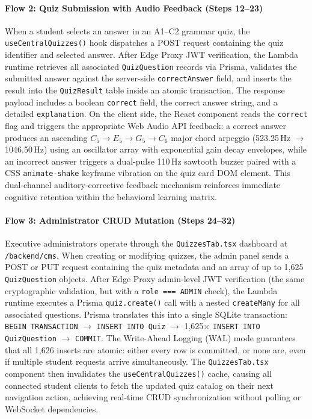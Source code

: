 \documentclass[12pt,a4paper]{article}
\begin{document}
\paragraph{Flow 2: Quiz Submission with Audio Feedback (Steps 12--23)}
When a student selects an answer in an A1--C2 grammar quiz, the \texttt{useCentralQuizzes()} hook dispatches a POST request containing the quiz identifier and selected answer. After Edge Proxy JWT verification, the Lambda runtime retrieves all associated \texttt{QuizQuestion} records via Prisma, validates the submitted answer against the server-side \texttt{correctAnswer} field, and inserts the result into the \texttt{QuizResult} table inside an atomic transaction. The response payload includes a boolean \texttt{correct} field, the correct answer string, and a detailed \texttt{explanation}. On the client side, the React component reads the \texttt{correct} flag and triggers the appropriate Web Audio API feedback: a correct answer produces an ascending $C_5 \rightarrow E_5 \rightarrow G_5 \rightarrow C_6$ major chord arpeggio (523.25\,Hz $\rightarrow$ 1046.50\,Hz) using an oscillator array with exponential gain decay envelopes, while an incorrect answer triggers a dual-pulse 110\,Hz sawtooth buzzer paired with a CSS \texttt{animate-shake} keyframe vibration on the quiz card DOM element. This dual-channel auditory-corrective feedback mechanism reinforces immediate cognitive retention within the behavioral learning matrix.

\paragraph{Flow 3: Administrator CRUD Mutation (Steps 24--32)}
Executive administrators operate through the \texttt{QuizzesTab.tsx} dashboard at \texttt{/backend/cms}. When creating or modifying quizzes, the admin panel sends a POST or PUT request containing the quiz metadata and an array of up to 1,625 \texttt{QuizQuestion} objects. After Edge Proxy admin-level JWT verification (the same cryptographic validation, but with a \texttt{role === \textquotesingle ADMIN\textquotesingle} check), the Lambda runtime executes a Prisma \texttt{quiz.create()} call with a nested \texttt{createMany} for all associated questions. Prisma translates this into a single SQLite transaction: \texttt{BEGIN TRANSACTION} $\rightarrow$ \texttt{INSERT INTO Quiz} $\rightarrow$ 1,625$\times$ \texttt{INSERT INTO QuizQuestion} $\rightarrow$ \texttt{COMMIT}. The Write-Ahead Logging (WAL) mode guarantees that all 1,626 inserts are atomic: either every row is committed, or none are, even if multiple student requests arrive simultaneously. The \texttt{QuizzesTab.tsx} component then invalidates the \texttt{useCentralQuizzes()} cache, causing all connected student clients to fetch the updated quiz catalog on their next navigation action, achieving real-time CRUD synchronization without polling or WebSocket dependencies.
\end{document}
